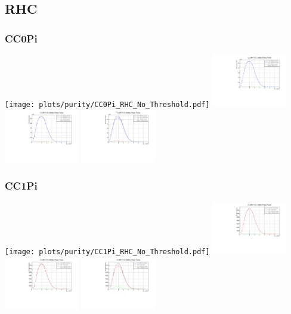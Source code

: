 \subsection{RHC}

\subsubsection{CC0Pi}

\begin{center}

\texttt{[image: plots/purity/CC0Pi\_RHC\_No\_Threshold.pdf]}
\includegraphics[width=0.245\textwidth]{plots/purity/CC0Pi_RHC_10MeV.pdf} 
\includegraphics[width=0.245\textwidth]{plots/purity/CC0Pi_RHC_20MeV.pdf}
\includegraphics[width=0.245\textwidth]{plots/purity/CC0Pi_RHC_50MeV.pdf}

\end{center}

\subsubsection{CC1Pi}

\begin{center}

\texttt{[image: plots/purity/CC1Pi\_RHC\_No\_Threshold.pdf]}
\includegraphics[width=0.245\textwidth]{plots/purity/CC1Pi_RHC_10MeV.pdf} 
\includegraphics[width=0.245\textwidth]{plots/purity/CC1Pi_RHC_20MeV.pdf}
\includegraphics[width=0.245\textwidth]{plots/purity/CC1Pi_RHC_50MeV.pdf}

\end{center}

